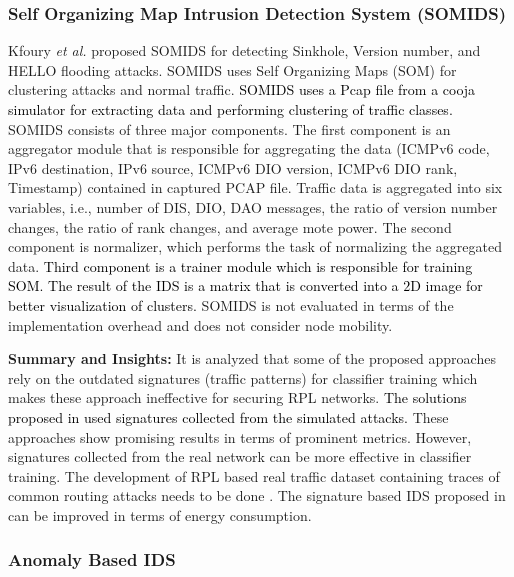 \documentclass[10pt,journal,sort & compress]{IEEEtran}
\begin{document}
\subsubsection*{Self Organizing Map Intrusion Detection System (SOMIDS)}

Kfoury \textit{et al.} \cite{kfoury2019self} proposed SOMIDS for detecting Sinkhole, Version number, and HELLO flooding attacks. SOMIDS uses Self Organizing Maps (SOM) for clustering attacks and normal traffic. \textcolor{black}{SOMIDS uses a Pcap file from a cooja simulator for extracting data and performing clustering of traffic classes.} SOMIDS consists of three major components. The first component is an aggregator module that is responsible for aggregating the data (ICMPv$ 6 $ code, IPv6 destination, IPv$ 6 $ source, ICMPv$ 6 $ DIO version, ICMPv$ 6 $ DIO rank, Timestamp) contained in captured PCAP file. Traffic data is aggregated into six variables, i.e., number of DIS, DIO, DAO messages, the ratio of version number changes, the ratio of rank changes, and average mote power. The second component is normalizer, which performs the task of normalizing the aggregated data. \textcolor{black}{Third component is a trainer module which is responsible for training SOM. The result of the IDS is a matrix that is converted into a $ 2 $D image for better visualization of clusters.} SOMIDS is not evaluated in terms of the implementation overhead and does not consider node mobility.    



\textbf{Summary and Insights:} It is analyzed that some of the proposed approaches \cite{kasinathan2013denial, kasinathan2013ids} rely on the outdated signatures (traffic patterns) for classifier training which makes these approach ineffective for securing RPL networks. \textcolor{black}{The solutions proposed in \cite{Napiah2018,kfoury2019self, shukla2017ml} used signatures collected from the simulated attacks.} These approaches show promising results in terms of prominent metrics. However, signatures collected from the real network can be more effective in classifier training. The development of RPL based real traffic dataset containing traces of common routing attacks needs to be done \cite{verma2019evaluation,abhishek_verma_IoTSIU}. The signature based IDS proposed in \cite{Napiah2018} can be improved in terms of energy consumption. 

\subsubsection{Anomaly Based IDS}
\end{document}
